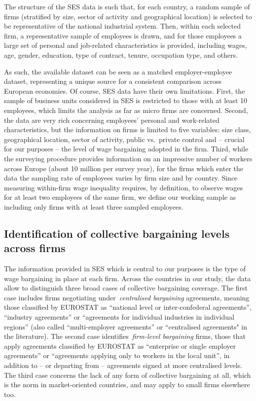\documentclass[12pt]{article}
\begin{document}
The structure of the SES data is such that, for each country, a random sample of firms (stratified by size, sector of activity and geographical location) is selected to be representative of the national industrial system. Then, within each selected firm, a representative sample of employees is drawn, and for those employees a large set of personal and job-related characteristics is provided, including wages, age, gender, education, type of contract, tenure, occupation type, and others. 

As such, the available dataset can be seen as a matched employer-employee dataset, representing a unique source for a consistent comparison across European economies.  Of course, SES data have their own limitations. First, the sample of business units considered in SES is restricted to those with at least 10 employees, which limits the analysis as far as micro firms are concerned. Second, the data are very rich concerning employees' personal and work-related characteristics, but the information on firms is limited to five variables: size class, geographical location, sector of activity, public vs.\ private control and -- crucial for our purposes -- the level of wage bargaining adopted in the firm. Third, while the surveying procedure provides information on an impressive number of workers across Europe (about 10 million per survey year), for the firms which enter the data the sampling rate of employees varies by firm size and by country. Since measuring within-firm wage inequality requires, by definition, to observe wages for at least two employees of the same firm, we define our working sample as including only firms with at least three sampled employees.

\subsection{Identification of collective bargaining levels across firms}
\label{sec:decentralisation}
The information provided in SES which is central to our purposes is the type of wage bargaining in place at each firm. Across the countries in our study, the data allow to distinguish three broad cases of collective bargaining coverage. The first case includes firms negotiating under~\emph{centralised bargaining} agreements, meaning those classified by EUROSTAT as “national level or inter-confederal agreements”, “industry agreements” or “agreements for individual industries in individual regions” (also called “multi-employer agreements” or “centralised agreements" in the literature). The second case identifies~\emph{firm-level bargaining} firms, those that apply agreements classified by EUROSTAT as “enterprise or single employer agreements” or “agreements applying only to workers in the local unit”, in addition to -- or departing from -- agreements signed at more centralised levels. The third case concerns the lack of any form of collective bargaining at all, which is the norm in market-oriented countries, and may apply to small firms elsewhere too.
\end{document}

